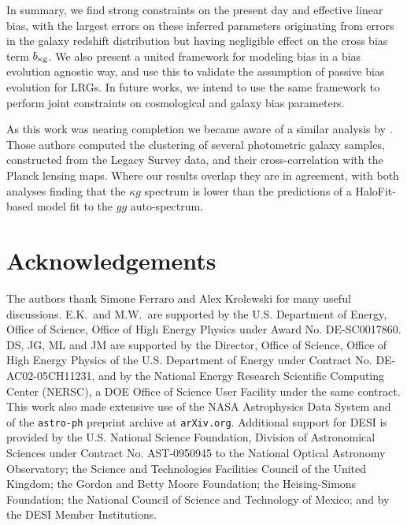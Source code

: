 \documentclass[a4paper,usenatbib]{mnras}
\begin{document}
In summary, we find strong constraints on the present day and effective linear bias, with the largest errors on these inferred parameters originating from errors in the galaxy redshift distribution but having negligible effect on the cross bias term $b_{\rm \kappa g}$. We also present a united framework for modeling bias in a bias evolution agnostic way, and use this to validate the assumption of passive bias evolution for LRGs. In future works, we intend to use the same framework to perform joint constraints on cosmological and galaxy bias parameters.

As this work was nearing completion we became aware of a similar analysis by \citet{Hang20}.  Those authors computed the clustering of several photometric galaxy samples, constructed from the Legacy Survey data, and their cross-correlation with the Planck lensing maps.  Where our results overlap they are in agreement, with both analyses finding that the $\kappa g$ spectrum is lower than the predictions of a HaloFit-based model fit to the $gg$ auto-spectrum.

\section*{Acknowledgements}
%

The authors thank Simone Ferraro and Alex Krolewski for many useful discussions. E.K.\  and M.W.\ are supported by the U.S. Department of Energy, Office of Science, Office of High Energy Physics under Award No. DE-SC0017860. DS, JG, ML and JM are supported by  the Director, Office of Science, Office of High Energy Physics of the U.S. Department of Energy under Contract No. DE-AC02-05CH11231, and by the National Energy Research Scientific Computing Center (NERSC), a DOE Office of Science User Facility under the same contract.  This work also made extensive use of the NASA Astrophysics Data System and of the \texttt{astro-ph} preprint archive at \texttt{arXiv.org}. Additional support for DESI is provided by the U.S. National Science Foundation, Division of Astronomical Sciences under Contract No. AST-0950945 to the National Optical Astronomy Observatory; the Science and Technologies Facilities Council of the United Kingdom; the Gordon and Betty Moore Foundation; the Heising-Simons Foundation; the National Council of Science and Technology of Mexico; and by the DESI Member Institutions.
\end{document}
